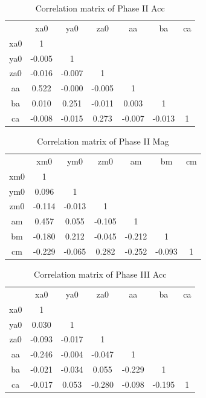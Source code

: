 \begin{table}[H]
    \centering
    \begin{tabular}{c|c|c|c|c|c|c}
             &   xa0  &   ya0  &   za0  &   aa   &   ba   & ca \\
         xa0 &  1     &        &        &        &        &    \\
         ya0 & -0.005 &  1     &        &        &        &    \\
         za0 & -0.016 & -0.007 &  1     &        &        &    \\
         aa  &  0.522 & -0.000 & -0.005 &  1     &        &    \\
         ba  &  0.010 &  0.251 & -0.011 &  0.003 &  1     &    \\
         ca  & -0.008 & -0.015 &  0.273 & -0.007 & -0.013 &  1 \\
    \end{tabular}
    \caption{Correlation matrix of Phase II Acc}
\end{table}

\begin{table}[H]
    \centering
    \begin{tabular}{c|c|c|c|c|c|c}
             &   xm0  & ym0    &   zm0  &   am   &   bm   & cm \\
         xm0 &  1     &        &        &        &        &    \\
         ym0 &  0.096 &  1     &        &        &        &    \\
         zm0 & -0.114 & -0.013 &  1     &        &        &    \\
         am  &  0.457 &  0.055 & -0.105 &  1     &        &    \\
         bm  & -0.180 &  0.212 & -0.045 & -0.212 &  1     &    \\
         cm  & -0.229 & -0.065 &  0.282 & -0.252 & -0.093 & 1  \\
    \end{tabular}
    \caption{Correlation matrix of Phase II Mag}
\end{table}

\begin{table}[H]
    \centering
    \begin{tabular}{c|c|c|c|c|c|c}
             &   xa0  &   ya0  &   za0  &   aa   &   ba   & ca \\
         xa0 &  1     &        &        &        &        &    \\
         ya0 &  0.030 &  1     &        &        &        &    \\
         za0 & -0.093 & -0.017 &  1     &        &        &    \\
         aa  & -0.246 & -0.004 & -0.047 &  1     &        &    \\
         ba  & -0.021 & -0.034 &  0.055 & -0.229 &  1     &    \\
         ca  & -0.017 &  0.053 & -0.280 & -0.098 & -0.195 &  1 \\
    \end{tabular}
    \caption{Correlation matrix of Phase III Acc}
    \label{tab:my_label}
\end{table}

